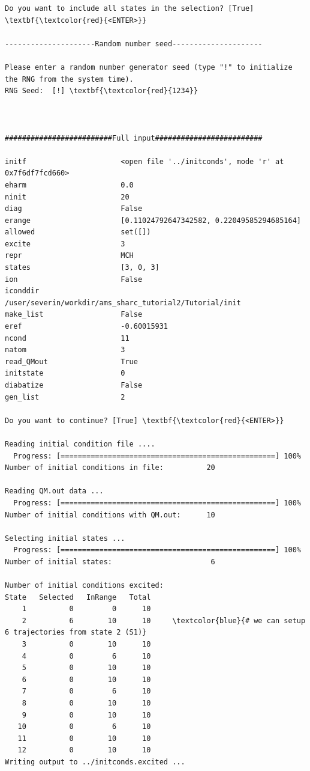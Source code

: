 \documentclass[a4paper,11pt,DIV=15,openany]{scrbook}
\begin{document}
\begin{oframed}
\begin{Verbatim}[commandchars=\\\{\}]
Do you want to include all states in the selection? [True] \textbf{\textcolor{red}{<ENTER>}}

---------------------Random number seed---------------------

Please enter a random number generator seed (type "!" to initialize the RNG from the system time).
RNG Seed:  [!] \textbf{\textcolor{red}{1234}}



#########################Full input#########################

initf                      <open file '../initconds', mode 'r' at 0x7f6df7fcd660>
eharm                      0.0
ninit                      20
diag                       False
erange                     [0.11024792647342582, 0.22049585294685164]
allowed                    set([])
excite                     3
repr                       MCH
states                     [3, 0, 3]
ion                        False
iconddir                   /user/severin/workdir/ams_sharc_tutorial2/Tutorial/init
make_list                  False
eref                       -0.60015931
ncond                      11
natom                      3
read_QMout                 True
initstate                  0
diabatize                  False
gen_list                   2

Do you want to continue? [True] \textbf{\textcolor{red}{<ENTER>}}

Reading initial condition file ....
  Progress: [==================================================] 100%
Number of initial conditions in file:          20

Reading QM.out data ...
  Progress: [==================================================] 100%
Number of initial conditions with QM.out:      10

Selecting initial states ...
  Progress: [==================================================] 100%
Number of initial states:                       6

Number of initial conditions excited:
State   Selected   InRange   Total
    1          0         0      10
    2          6        10      10     \textcolor{blue}{# we can setup 6 trajectories from state 2 (S1)}
    3          0        10      10
    4          0         6      10
    5          0        10      10
    6          0        10      10
    7          0         6      10
    8          0        10      10
    9          0        10      10
   10          0         6      10
   11          0        10      10
   12          0        10      10
Writing output to ../initconds.excited ...
\end{Verbatim}
\end{oframed}
\end{document}
